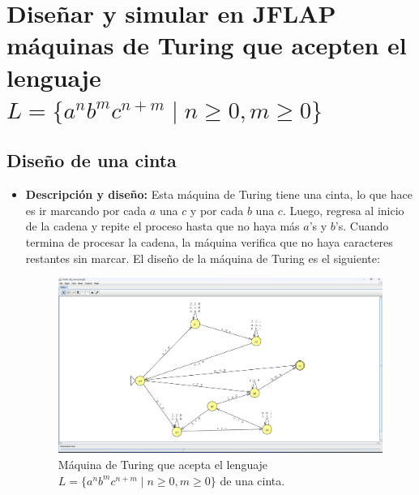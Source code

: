 \documentclass[11pt]{report}
\begin{document}
\newpage

\section{Diseñar y simular en JFLAP máquinas de Turing que acepten el lenguaje $L = \{a^nb^mc^{n+m} \mid n \geq 0, m \geq 0\}$}
\subsection{Diseño de una cinta}
\begin{itemize}
  \item \textbf{Descripción y diseño:} Esta máquina de Turing tiene una cinta, lo que hace es ir marcando por cada $a$ una $c$ y por cada $b$ una $c$. Luego, regresa al inicio de la cadena y repite el proceso hasta que no haya más $a$'s y $b$'s. Cuando termina de procesar la cadena, la máquina verifica que no haya caracteres restantes sin marcar. El diseño de la máquina de Turing es el siguiente:

        \begin{figure}[H]
          \centering
          \includegraphics[scale=0.33]{img/MT_02_one_ribbon.png}
          \caption{Máquina de Turing que acepta el lenguaje $L = \{a^nb^mc^{n+m} \mid n \geq 0, m \geq 0\}$ de una cinta.}
          \label{fig:maquina de turing que acepta el lenguaje L = {a^nb^mc^{n+m} | n >= 0, m >= 0}}
        \end{figure}

  \newpage


\end{itemize}
\end{document}
